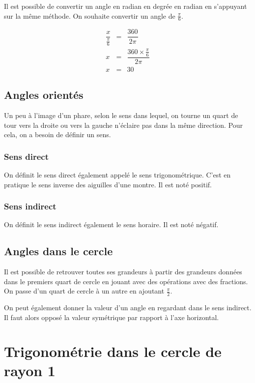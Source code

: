 \documentclass[paper=a4, fontsize=11pt]{scrartcl} %
\begin{document}
Il est possible de convertir un angle en radian en degrée en radian en s'appuyant sur la même méthode. On souhaite convertir un angle de $\frac{\pi}{6}$.

\begin{eqnarray*}
  \dfrac{x}{ \frac{\pi}{6} } &=& \dfrac{360}{2 \pi}\\
  x &=& \dfrac{360  \times \frac{\pi}{6}}{2 \pi}\\
  x &=& 30 
\end{eqnarray*}

\subsection{Angles orientés}

Un peu à l'image d'un phare, selon le sens dans lequel, on tourne un quart de tour vers la droite ou vers la gauche n'éclaire pas dans la même direction. Pour cela, on a besoin de définir un sens.

\subsubsection{Sens direct}

On définit le sens direct également appelé le sens trigonométrique. C'est en pratique le sens inverse des aiguilles d'une montre. Il est noté positif.

\subsubsection{Sens indirect}

On définit le sens indirect également le sens horaire. Il est noté négatif.

\subsection{Angles dans le cercle}


Il est possible de retrouver toutes ses grandeurs à partir des grandeurs données dans le premiers quart de cercle en jouant avec des opérations avec des fractions. On passe d'un quart de cercle à un autre en ajoutant $\frac{\pi}{2}$.

On peut également donner la valeur d'un angle en regardant dans le sens indirect. Il faut alors opposé la valeur symétrique par rapport à l'axe horizontal.

\section{Trigonométrie dans le cercle de rayon 1}
\end{document}
